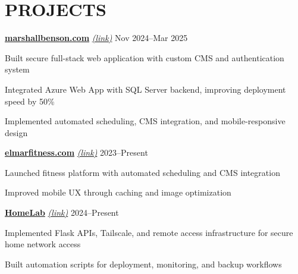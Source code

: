 \documentclass[11pt]{article}
\begin{document}
\section*{PROJECTS}

\textbf{\href{https://marshallbenson.com}{marshallbenson.com}} \href{https://marshallbenson.com}{\textit{(link)}} \hfill Nov 2024--Mar 2025
\begin{compactitem}
  \item Built secure full-stack web application with custom CMS and authentication system
  \item Integrated Azure Web App with SQL Server backend, improving deployment speed by 50\%
  \item Implemented automated scheduling, CMS integration, and mobile-responsive design
\end{compactitem}

\textbf{\href{https://elmarfitness.com}{elmarfitness.com}} \href{https://elmarfitness.com}{\textit{(link)}} \hfill 2023--Present
\begin{compactitem}
  \item Launched fitness platform with automated scheduling and CMS integration
  \item Improved mobile UX through caching and image optimization
\end{compactitem}

\textbf{\href{https://mig.is-a.dev}{HomeLab}} \href{https://mig.is-a.dev}{\textit{(link)}} \hfill 2024--Present
\begin{compactitem}
  \item Implemented Flask APIs, Tailscale, and remote access infrastructure for secure home network access
  \item Built automation scripts for deployment, monitoring, and backup workflows
\end{compactitem}
\end{document}
